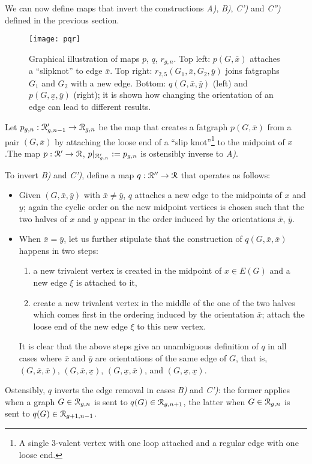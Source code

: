 We can now define maps that invert the constructions {\slshape A)}, {\slshape B)},
{\slshape C')} and {\slshape C'')} defined in the previous section.
\begin{figure}
  \centering
  \texttt{[image: pqr]}
  \caption{Graphical illustration of maps $p$, $q$, $r_{g,n}$.  Top left: $p(G,\bar{x})$ attaches a ``slipknot'' to edge $\bar{x}$.  Top right: $r_{2,5}(G_1, \bar{x}, G_2, \bar{y})$ joins fatgraphs $G_1$ and $G_2$ with a new edge. Bottom: $q(G,\bar{x}, \bar{y})$ (left) and $p(G, \underline{x}, \bar{y})$ (right); it is shown how changing the orientation of an edge can lead to different results.}
  \label{fig:pqr}
\end{figure}

Let $p_{g,n} : \mathcal{R}'_{g,n-1} \to \mathcal{R}_{g,n}$ be the map that creates a
fatgraph $p(G,\bar{x})$ from a pair $(G, \bar{x})$ by attaching the
loose end of a ``slip knot''\footnote{A single 3-valent vertex with
  one loop attached and a regular edge with one loose end.} to the
midpoint of $x$.The map $p: \mathcal{R}' \to \mathcal{R}$, $p|_{\mathcal{R}'_{g,n}} := p_{g,n}$
is ostensibly inverse to {\slshape A)}.

To invert {\slshape B)} and {\slshape C')}, define a map $q : \mathcal{R}'' \to \mathcal{R}$ that
operates as follows:
\begin{itemize}
\item Given $(G, \bar{x}, \bar{y})$ with $\bar{x} \not= \bar{y}$, $q$
  attaches a new edge to the midpoints of $x$ and $y$; again the
  cyclic order on the new midpoint vertices is chosen such that the
  two halves of $x$ and $y$ appear in the order induced by the
  orientations $\bar x$, $\bar y$.
\item When $\bar{x} = \bar{y}$, let us further stipulate that the
  construction of $q(G, \bar{x}, \bar{x})$ happens in two steps:
  \begin{enumerate}
  \item a new trivalent vertex is created in the midpoint of $x \in
    E(G)$ and a new edge $\xi$ is attached to it,
  \item create a new trivalent vertex in the middle of the one of the
    two halves which comes first in the ordering induced by the
    orientation $\bar{x}$; attach the loose end of the new edge $\xi$
    to this new vertex.
  \end{enumerate}
  It is clear that the above steps give an unambiguous definition of
  $q$ in all cases where $\bar{x}$ and $\bar{y}$ are orientations of
  the same edge of $G$, that is, $(G, \bar{x}, \bar{x})$, $(G,
  \bar{x}, \underline{x})$, $(G, \underline{x}, \bar{x})$, and $(G,
  \underline{x}, \underline{x})$.
\end{itemize}
Ostensibly, $q$ inverts the edge removal in cases {\slshape B)} and
{\slshape C')}: the former applies when a graph $G \in \mathcal{R}_{g,n}$ is
sent to $q(G) \in \mathcal{R}_{g,n+1}$, the latter when $G \in \mathcal{R}_{g,n}$ is
sent to $q(G) \in \mathcal{R}_{g+1,n-1}$.

